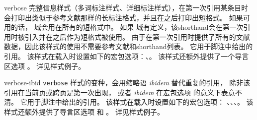 \begin{marglist}
\item[verbose]
完整信息样式（多词标注样式、详细标注样式），在第一次引用某条目时会打印出类似于参考文献那样的长标注格式，并且在之后打印出短格式。
如果可用的话， 域会用在所有的短格式中。
如果  域有定义，该shorthand会在第一次引用时被引入并在之后作为短格式被使用。
由于在第一次引用时提供了所有的文献数据，因此该样式的使用不需要参考文献和shorthand列表。
它用于脚注中给出的引用。
该样式在载入时设置如下的宏包选项：、。
该样式还额外提供了一个导言区选项 。
详见样式例子。

\item[verbose-ibid]
\texttt{verbose} 样式的变种，会用缩略语 \emph{ibidem} 替代重复的引用，
除非该引用在当前页或跨页是第一次出现，
或者 \emph{ibidem} 在宏包选项  的意义下表意不清。
它用于脚注中给出的引用。
该样式在载入时设置如下的宏包选项：
、、、。
该样式还额外提供了导言区选项  和 。
详见样式例子。


\end{marglist}
